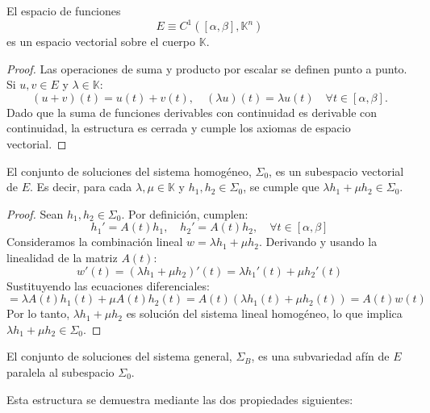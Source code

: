 \begin{proposición}
    El espacio de funciones
    \[
        E \equiv C^{1}([\alpha, \beta], \mathbb{K}^n)
    \]
    es un espacio vectorial sobre el cuerpo \(\mathbb{K}\).
\end{proposición}
\begin{proof}
    Las operaciones de suma y producto por escalar se definen punto a punto. Si $u,v \in E$ y $\lambda \in \mathbb{K}$:
    \[
        (u+v)(t) = u(t) + v(t), \quad (\lambda u)(t) = \lambda u(t) \quad \forall t \in [\alpha, \beta].
    \]
    Dado que la suma de funciones derivables con continuidad es derivable con continuidad, la estructura es cerrada y cumple los axiomas de espacio vectorial.
\end{proof}

\begin{proposición}
    El conjunto de soluciones del sistema homogéneo, $\Sigma_0$, es un subespacio vectorial de $E$. Es decir, para cada $\lambda, \mu \in \mathbb{K}$ y $h_1, h_2 \in \Sigma_0$, se cumple que $\lambda h_1 + \mu h_2 \in \Sigma_0$.
\end{proposición}

\begin{proof}
    Sean $h_1, h_2 \in \Sigma_0$. Por definición, cumplen:
    \[
    h_1' = A(t) h_1, \quad h_2' = A(t) h_2, \quad \forall t \in [\alpha, \beta]
    \]
    Consideramos la combinación lineal $w = \lambda h_1 + \mu h_2$. Derivando y usando la linealidad de la matriz $A(t)$:
    \[
    w'(t) = (\lambda h_1 + \mu h_2)'(t) = \lambda h_1'(t) + \mu h_2'(t) 
    \]
    Sustituyendo las ecuaciones diferenciales:
    \[
    = \lambda A(t) h_1(t) + \mu A(t) h_2(t) = A(t) \left( \lambda h_1(t) + \mu h_2(t) \right) = A(t) w(t)
    \]
    Por lo tanto, $\lambda h_1 + \mu h_2$ es solución del sistema lineal homogéneo, lo que implica $\lambda h_1 + \mu h_2 \in \Sigma_0$.
\end{proof}

\begin{proposición}
    El conjunto de soluciones del sistema general, $\Sigma_B$, es una subvariedad afín de $E$ paralela al subespacio $\Sigma_0$.
\end{proposición}

Esta estructura se demuestra mediante las dos propiedades siguientes:

